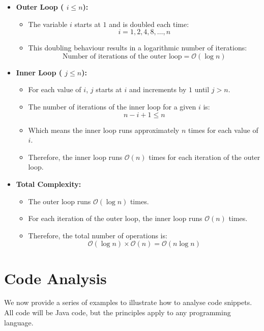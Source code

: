 \begin{example}
\begin{itemize}
    \item \textbf{Outer Loop (\texttt{\While} $i \leq n$):}
    \begin{itemize}
        \item The variable $i$ starts at $1$ and is doubled each time:
        \[ i = 1, 2, 4, 8, \ldots, n \]
        \item This doubling behaviour results in a logarithmic number of iterations:
        \[ \text{Number of iterations of the outer loop} = \mathcal{O}(\log n) \]
    \end{itemize}
    \item \textbf{Inner Loop (\texttt{\While} $j \leq n$):}
    \begin{itemize}
        \item For each value of $i$, $j$ starts at $i$ and increments by $1$ until $j > n$.
        \item The number of iterations of the inner loop for a given $i$ is:
        \[ n - i + 1 \leq n \]
        \item Which means the inner loop runs approximately $n$ times for each value of $i$.
        \item Therefore, the inner loop runs $\mathcal{O}(n)$ times for each iteration of the outer loop.
    \end{itemize}
    \item \textbf{Total Complexity:}
    \begin{itemize}
        \item The outer loop runs $\mathcal{O}(\log n)$ times.
        \item For each iteration of the outer loop, the inner loop runs $\mathcal{O}(n)$ times.
        \item Therefore, the total number of operations is:
        \[ \mathcal{O}(\log n) \times \mathcal{O}(n) = \mathcal{O}(n \log n) \]
    \end{itemize}
\end{itemize}
    
\end{example}
    
\section{Code Analysis}
We now provide a series of examples to illustrate how to analyse code snippets. All code will be Java code, but the principles apply to any programming language.

